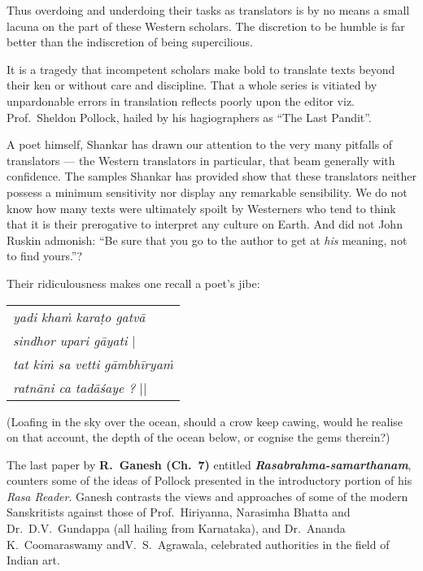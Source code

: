Thus overdoing and underdoing their tasks as translators is by no means a small lacuna on the part of these Western scholars. The discretion to be humble is far better than the indiscretion of being supercilious.

It is a tragedy that incompetent scholars make bold to translate texts beyond their ken or without care and discipline. That a whole series is vitiated by unpardonable errors in translation reflects poorly upon the editor viz. Prof.\ Sheldon Pollock, hailed by his hagiographers as “The Last Pandit”.

A poet himself, Shankar has drawn our attention to the very many pitfalls of translators --- the Western translators in particular, that beam generally with confidence. The samples Shankar has provided show that these translators neither possess a minimum sensitivity nor display any remarkable sensibility. We do not know how many texts were ultimately spoilt by Westerners who tend to think that it is their prerogative to interpret any culture on Earth. And did not John Ruskin admonish: ``Be sure that you go to the author to get at \textsl{his} meaning, not to find yours.''?

Their ridiculousness makes one recall a poet's jibe:
\begin{center}
\begin{tabular}{l}
\textsl{yadi khaṁ karaṭo gatvā}\\
\phantom{aaaaaa}\textsl{sindhor upari gāyati} |\\
\textsl{tat kiṁ sa vetti gāmbhīryaṁ}\\
\phantom{aaaaaa}\textsl{ratnāni ca tadāśaye ?} ||
\end{tabular}
\end{center}
(Loafing in the sky over the ocean, should a crow keep cawing, would he realise on that account, the depth of the ocean below, or cognise the gems therein?) 

The last paper by {\bf R.~Ganesh (Ch.~7)} entitled \textbf{\textsl{Rasabrahma-samartha\-nam}}, counters some of the ideas of Pollock presented in the introductory portion of his \textsl{Rasa Reader}. Ganesh contrasts the views and approaches of some of the modern Sanskritists against those of Prof.\  Hiriyanna, Narasimha Bhatta and Dr.\ D.V.\ Gundappa (all hailing from Karnataka), and Dr.\ Ananda K.\ Coomaraswamy and\break V.\ S.\ Agrawala, celebrated authorities in the field of Indian art.

